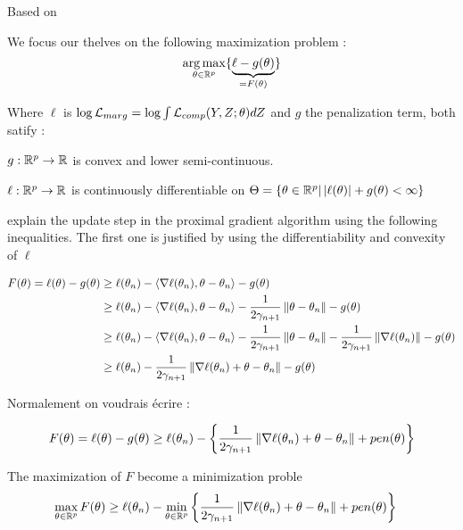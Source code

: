 \documentclass[a4paper]{article}
\renewcommand{\pen}{g}
\renewcommand{\logmarg}[1][]{\ell}
\begin{document}
 
\begin{myText}


Based on \cite{fort_stochastic_2017}


We focus our thelves on the following maximization problem :
$$\argmax_{\theta \in \setr^p} \{\ub{\logmarg - \pen(\theta)}_{=F(\theta)}\}$$

Where $\logmarg$ is $\log\mathcal L_{marg} = \log \int \mathcal L_{comp}(Y,Z;\theta) dZ$ and $\pen$ the penalization term, both satify : 
\begin{myItemize}[blue]
    \item $\pen : \setr^p \rightarrow \setr$ is convex and lower semi-continuous.
    \item $\logmarg : \setr^p \rightarrow \setr$ is continuously differentiable on $\Theta = \{ \theta\in\setr^p | \abs{\logmarg(\theta)} + \pen(\theta) < \infty\}$
\end{myItemize}

\citeauthor{fort_stochastic_2017} explain the update step in the proximal gradient algorithm using the following inequalities. The first one is justified by using the differentiability and convexity of $\logmarg$



\begin{align*}
    F(\theta) = \logmarg(\theta) - \pen(\theta)
    & \geq  \logmarg(\theta_n) - \sca{\nabla \logmarg(\theta_n), \theta - \theta_n} - \pen(\theta)
    \\ &\geq  \logmarg(\theta_n) - \sca{\nabla \logmarg(\theta_n), \theta - \theta_n} -\frac 1{2\gamma_{n+1}}\norm{\theta-\theta_n} - \pen(\theta)
    \\ & \geq  \logmarg(\theta_n) - \sca{\nabla \logmarg(\theta_n), \theta - \theta_n} -\frac 1{2\gamma_{n+1}}\norm{\theta-\theta_n}-\frac 1{2\gamma_{n+1}}\norm{\nabla \logmarg(\theta_n)} - \pen(\theta)
    \\ & \geq \logmarg(\theta_n) -\frac 1{2\gamma_{n+1}} \norm{\nabla \logmarg(\theta_n)+ \theta -\theta_n} -\pen(\theta)
\end{align*}


Normalement on voudrais écrire : 

$$F(\theta) = \logmarg(\theta) - g(\theta) \geq \logmarg(\theta_n) - \left\{ \frac 1{2\gamma_{n+1}} \norm{\nabla \logmarg(\theta_n)+ \theta -\theta_n} + pen(\theta) \right\}$$

The maximization of $F$ become a minimization proble
\begin{align}
    \max_{\theta \in \setr^p} F(\theta) 
    &\geq \logmarg(\theta_n) - \min_{\theta\in\setr^p}  \left\{ \frac 1{2\gamma_{n+1}} \norm{\nabla \logmarg(\theta_n)+ \theta -\theta_n} + pen(\theta) \right\} 
\end{align}

\end{myText}
\end{document}
